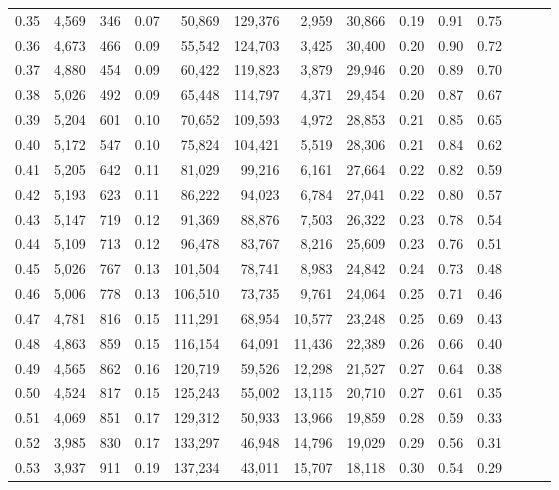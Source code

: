 \begin{tabular}{rrrrrrrrrrrrrr}
0.35 &  4,569 &  346 &  0.07 &   50,869 &  129,376 &   2,959 &  30,866 &  0.19 &  0.91 &      0.75 \\
0.36 &  4,673 &  466 &  0.09 &   55,542 &  124,703 &   3,425 &  30,400 &  0.20 &  0.90 &      0.72 \\
0.37 &  4,880 &  454 &  0.09 &   60,422 &  119,823 &   3,879 &  29,946 &  0.20 &  0.89 &      0.70 \\
0.38 &  5,026 &  492 &  0.09 &   65,448 &  114,797 &   4,371 &  29,454 &  0.20 &  0.87 &      0.67 \\
0.39 &  5,204 &  601 &  0.10 &   70,652 &  109,593 &   4,972 &  28,853 &  0.21 &  0.85 &      0.65 \\
0.40 &  5,172 &  547 &  0.10 &   75,824 &  104,421 &   5,519 &  28,306 &  0.21 &  0.84 &      0.62 \\
0.41 &  5,205 &  642 &  0.11 &   81,029 &   99,216 &   6,161 &  27,664 &  0.22 &  0.82 &      0.59 \\
0.42 &  5,193 &  623 &  0.11 &   86,222 &   94,023 &   6,784 &  27,041 &  0.22 &  0.80 &      0.57 \\
0.43 &  5,147 &  719 &  0.12 &   91,369 &   88,876 &   7,503 &  26,322 &  0.23 &  0.78 &      0.54 \\
0.44 &  5,109 &  713 &  0.12 &   96,478 &   83,767 &   8,216 &  25,609 &  0.23 &  0.76 &      0.51 \\
0.45 &  5,026 &  767 &  0.13 &  101,504 &   78,741 &   8,983 &  24,842 &  0.24 &  0.73 &      0.48 \\
0.46 &  5,006 &  778 &  0.13 &  106,510 &   73,735 &   9,761 &  24,064 &  0.25 &  0.71 &      0.46 \\
0.47 &  4,781 &  816 &  0.15 &  111,291 &   68,954 &  10,577 &  23,248 &  0.25 &  0.69 &      0.43 \\
0.48 &  4,863 &  859 &  0.15 &  116,154 &   64,091 &  11,436 &  22,389 &  0.26 &  0.66 &      0.40 \\
0.49 &  4,565 &  862 &  0.16 &  120,719 &   59,526 &  12,298 &  21,527 &  0.27 &  0.64 &      0.38 \\
0.50 &  4,524 &  817 &  0.15 &  125,243 &   55,002 &  13,115 &  20,710 &  0.27 &  0.61 &      0.35 \\
0.51 &  4,069 &  851 &  0.17 &  129,312 &   50,933 &  13,966 &  19,859 &  0.28 &  0.59 &      0.33 \\
0.52 &  3,985 &  830 &  0.17 &  133,297 &   46,948 &  14,796 &  19,029 &  0.29 &  0.56 &      0.31 \\
0.53 &  3,937 &  911 &  0.19 &  137,234 &   43,011 &  15,707 &  18,118 &  0.30 &  0.54 &      0.29 \\

\end{tabular}

